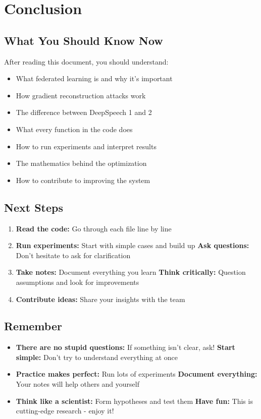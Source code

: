 \documentclass[12pt]{article}
\begin{document}
\section{Conclusion}

\subsection{What You Should Know Now}

After reading this document, you should understand:
\begin{itemize}
    \item What federated learning is and why it's important
    \item How gradient reconstruction attacks work
    \item The difference between DeepSpeech 1 and 2
    \item What every function in the code does
    \item How to run experiments and interpret results
    \item The mathematics behind the optimization
    \item How to contribute to improving the system
\end{itemize}

\subsection{Next Steps}

\begin{enumerate}
    \item \textbf{Read the code:} Go through each file line by line
    \item \textbf{Run experiments:} Start with simple cases and build up
    \textbf{Ask questions:} Don't hesitate to ask for clarification
    \item \textbf{Take notes:} Document everything you learn
    \textbf{Think critically:} Question assumptions and look for improvements
    \item \textbf{Contribute ideas:} Share your insights with the team
\end{enumerate}

\subsection{Remember}

\begin{itemize}
    \item \textbf{There are no stupid questions:} If something isn't clear, ask!
    \textbf{Start simple:} Don't try to understand everything at once
    \item \textbf{Practice makes perfect:} Run lots of experiments
    \textbf{Document everything:} Your notes will help others and yourself
    \item \textbf{Think like a scientist:} Form hypotheses and test them
    \textbf{Have fun:} This is cutting-edge research - enjoy it!
\end{itemize}
\end{document}
